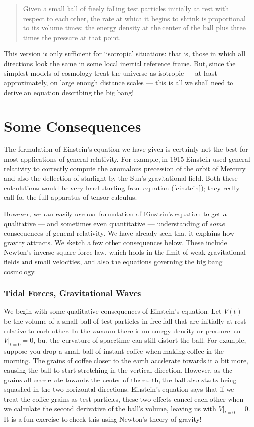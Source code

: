 \begin{quote}
Given a small ball of freely falling test particles initially at rest
with respect to each other, the rate at which it begins to shrink is
proportional to its volume times: the energy density at the center of
the ball plus three times the pressure at that point.
\end{quote}

\noindent
This version is only sufficient for `isotropic' situations: that
is, those in which all directions look the same in some local inertial
reference frame.  But, since the simplest models of cosmology treat
the universe as isotropic --- at least approximately, on large enough
distance scales --- this is all we shall need to derive an equation
describing the big bang!

\section{Some Consequences}

The formulation of Einstein's equation we have given is certainly not
the best for most applications of general relativity.   For example, in
1915 Einstein used general relativity to correctly compute the 
anomalous precession of the orbit of Mercury and also the deflection of
starlight by the Sun's gravitational field.  Both these calculations
would be very hard starting from equation (\ref{einstein}); they 
really call for the full apparatus of tensor calculus.   

However, we can easily use our formulation of Einstein's equation to get a 
qualitative --- and sometimes even quantitative  --- understanding of 
{\it some} consequences of general relativity.  We have already seen that it
explains how gravity attracts.  We sketch a few other consequences below.
These include Newton's inverse-square force law,
which holds in the limit of weak gravitational fields and small velocities,
and also the equations governing the big bang cosmology.

\subsubsection*{Tidal Forces, Gravitational Waves}

We begin with some qualitative consequences of Einstein's equation.
Let $V(t)$ be the volume of a small ball of test particles in free fall
that are initially at rest relative to each other.  
In the vacuum there is no energy density or
pressure, so $\ddot V|_{t = 0} = 0$, but the curvature of spacetime can
still distort the ball.  For example, suppose you drop a small ball of
instant coffee when making coffee in the morning.   The grains of 
coffee closer to the earth accelerate towards it a bit more, causing the ball 
to start stretching in the vertical direction.  However, as the grains all
accelerate towards the center of the earth, the ball also starts
being squashed in the two horizontal directions.  Einstein's equation says
that if we treat the coffee grains as test particles, these two effects
cancel each other when we calculate the second derivative of the ball's
volume, leaving us with $\ddot V|_{t = 0} = 0$.    It is a fun exercise
to check this using Newton's theory of gravity!   

